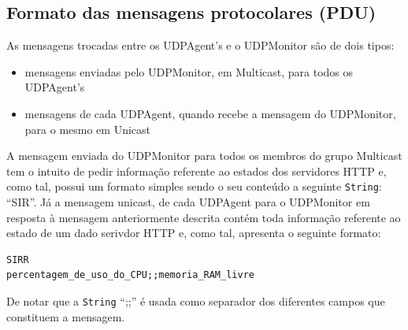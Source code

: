 \documentclass{article}
\begin{document}
\subsection{Formato das mensagens protocolares (PDU)}
As mensagens trocadas entre os UDPAgent's e o UDPMonitor são de dois tipos: 
\begin{itemize}
    \item mensagens enviadas pelo UDPMonitor, em Multicast, para todos os UDPAgent's
    \item mensagens de cada UDPAgent, quando recebe a mensagem do UDPMonitor, para o mesmo em Unicast
\end{itemize}

A mensagem enviada do UDPMonitor para todos os membros do grupo Multicast tem o intuito de pedir informação referente ao estados dos servidores HTTP e, como tal, possui um formato simples sendo o seu conteúdo a seguinte \texttt{String}: ``SIR''.
Já a mensagem unicast, de cada UDPAgent para o UDPMonitor em resposta à mensagem anteriormente descrita contém toda informação referente ao estado de um dado serivdor HTTP e, como tal, apresenta o seguinte formato:
\begin{verbatim}
SIRR
percentagem_de_uso_do_CPU;;memoria_RAM_livre
\end{verbatim}
De notar que a \texttt{String} ``;;'' é usada como separador dos diferentes campos que constituem a mensagem. 
\end{document}
